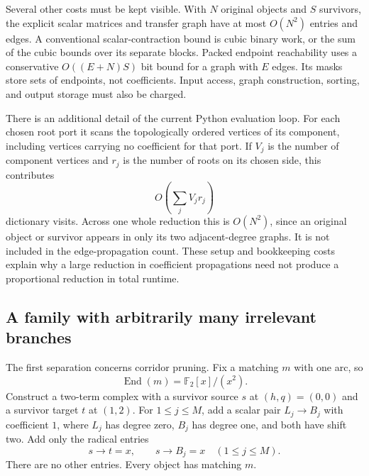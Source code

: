 Several other costs must be kept visible.  With $N$ original objects and $S$
survivors, the explicit scalar matrices and transfer graph have at most
$O(N^2)$ entries and edges.  A conventional scalar-contraction bound is cubic
binary work, or the sum of the cubic bounds over its separate blocks.
Packed endpoint reachability uses a conservative $O((E+N)S)$ bit bound for a
graph with $E$ edges.  Its masks store sets of endpoints, not coefficients.
Input access, graph construction, sorting, and output storage must also be
charged.

There is an additional detail of the current Python evaluation loop.  For
each chosen root port it scans the topologically ordered vertices of its
component, including vertices carrying no coefficient for that port.  If
$V_j$ is the number of component vertices and $r_j$ is the number of roots
on its chosen side, this contributes
\begin{equation}\label{eq:corridor-vertex-visits}
 O\!\left(\sum_jV_jr_j\right)
\end{equation}
dictionary visits.  Across one whole reduction this is $O(N^2)$, since an
original object or survivor appears in only its two adjacent-degree graphs.
It is not included in the edge-propagation count.  These setup and bookkeeping
costs explain why a large reduction in coefficient propagations need not
produce a proportional reduction in total runtime.

\subsection{A family with arbitrarily many irrelevant branches}

The first separation concerns corridor pruning.  Fix a matching $m$ with one
arc, so
\[
 \operatorname{End}(m)=\mathbb F_2[x]/(x^2).
\]
Construct a two-term complex with a survivor source $s$ at $(h,q)=(0,0)$ and
a survivor target $t$ at $(1,2)$.  For $1\le j\le M$, add a scalar pair
$L_j\to B_j$ with coefficient $1$, where $L_j$ has degree zero, $B_j$ has
degree one, and both have shift two.  Add only the radical entries
\begin{equation}\label{eq:corridor-dead-family}
 s\longrightarrow t=x,
 \qquad s\longrightarrow B_j=x\quad(1\le j\le M).
\end{equation}
There are no other entries.  Every object has matching $m$.

